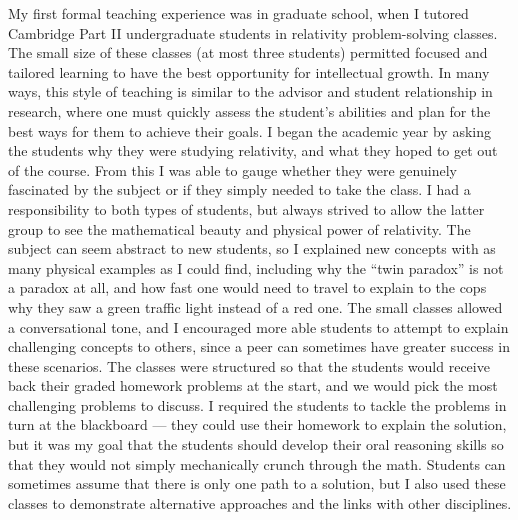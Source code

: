 \documentclass[11pt,letterpaper,sans]{moderncv} %
\begin{document}
My first formal teaching experience was in graduate school, when I tutored Cambridge Part II undergraduate students in relativity problem-solving classes. The small size of these classes (at most three students) permitted focused and tailored learning to have the best opportunity for intellectual growth. In many ways, this style of teaching is similar to the advisor and student relationship in research, where one must quickly assess the student's abilities and plan for the best ways for them to achieve their goals. I began the academic year by asking the students why they were studying relativity, and what they hoped to get out of the course. From this I was able to gauge whether they were genuinely fascinated by the subject or if they simply needed to take the class. I had a responsibility to both types of students, but always strived to allow the latter group to see the mathematical beauty and physical power of relativity. The subject can seem abstract to new students, so I explained new concepts with as many physical examples as I could find, including why the ``twin paradox'' is not a paradox at all, and how fast one would need to travel to explain to the cops why they saw a green traffic light instead of a red one. The small classes allowed a conversational tone, and I encouraged more able students to attempt to explain challenging concepts to others, since a peer can sometimes have greater success in these scenarios. The classes were structured so that the students would receive back their graded homework problems at the start, and we would pick the most challenging problems to discuss. I required the students to tackle the problems in turn at the blackboard --- they could use their homework to explain the solution, but it was my goal that the students should develop their oral reasoning skills so that they would not simply mechanically crunch through the math. Students can sometimes assume that there is only one path to a solution, but I also used these classes to demonstrate alternative approaches and the links with other disciplines. 
\vspace{2mm}
\end{document}
